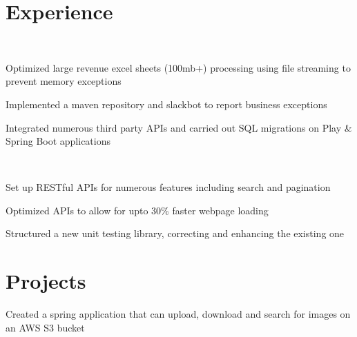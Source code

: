\documentclass[]{hieudo-build}
\begin{document}
\begin{minipage}[t]{0.65\textwidth} 

\section{Experience}

\\
\color{myyellow}
\vspace{0.9em} %
\begin{tightemize}
\item Optimized large revenue excel sheets (100mb+) processing using file streaming to prevent memory exceptions
\item Implemented a maven repository and slackbot to report business exceptions
\item Integrated numerous third party APIs and carried out SQL migrations on Play \& Spring Boot applications
\end{tightemize}
\sectionsep

 \\
\begin{tightemize}
\item Set up RESTful APIs for numerous features including search and pagination 
\item Optimized APIs to allow for upto 30\% faster webpage loading
\item  Structured a new unit testing library, correcting and enhancing the existing one
\end{tightemize}
\sectionsep


\sectionsep

\section{Projects}

\descript{}
Created a spring application that can upload, download and search for images on an AWS S3 bucket
\sectionsep 




\end{minipage} 
\end{document}
